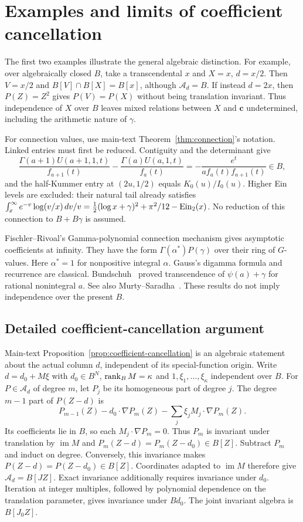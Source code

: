 \section{Examples and limits of coefficient cancellation}\label{sup:cancellation-remarks}
The first two examples illustrate the general algebraic distinction.
For example, over algebraically closed $B$, take a transcendental $x$
and $X=x$, $d=x/2$. Then $V=x/2$ and $B[V]\cap B[X]=B[x]$, although
$\mathcal A_d=B$. If instead $d=2x$, then $P(Z)=Z^2$ gives
$P(V)=P(X)$ without being translation invariant. Thus independence of
$X$ over $B$ leaves mixed relations between $X$ and $\mathbf c$ undetermined,
including the arithmetic nature of $\gamma$.

For connection values, use main-text Theorem~\ref{thm:connection}'s notation.
Linked entries must first be reduced. Contiguity and the determinant give
\[
 \frac{\Gamma(a+1)U(a+1,1,t)}{f_{a+1}(t)}
 -\frac{\Gamma(a)U(a,1,t)}{f_a(t)}
 =-\frac{e^t}{a f_a(t)f_{a+1}(t)}\in B,
\]
and the half-Kummer entry at $(2u,1/2)$ equals $K_0(u)/I_0(u)$.
Higher Ein levels are excluded: their natural tail already satisfies
$\int_x^\infty e^{-v}\log(v/x)\,dv/v
 =\tfrac12(\log x+\gamma)^2+\pi^2/12-\operatorname{Ein}_2(x)$.
No reduction of this connection to $B+B\gamma$ is assumed.

Fischler--Rivoal's Gamma-polynomial connection mechanism
\cite[Theorem~2(iii) and the subsequent discussion on p.~35]{FischlerRivoal2016}
gives asymptotic coefficients at infinity.
They have the form $\Gamma(\alpha^*)P(\gamma)$ over their ring of $G$-values.
Here $\alpha^*=1$ for nonpositive integral $\alpha$.
Gauss's digamma formula and recurrence are classical.
Bundschuh~\cite[Corollary~1]{Bundschuh1979} proved transcendence of
$\psi(a)+\gamma$ for rational nonintegral $a$. See also
Murty--Saradha~\cite[Theorems~1, 3--4]{MurtySaradha2007}.
These results do not imply independence over the present $B$.

\subsection*{Detailed coefficient-cancellation argument}
Main-text Proposition~\ref{prop:coefficient-cancellation} is an algebraic
statement about the actual column $d$, independent of its special-function
origin. Write $d=d_0+M\xi$ with $d_0\in B^N$, $\operatorname{rank}_B M=\kappa$
and $1,\xi_1,\ldots,\xi_\kappa$ independent over $B$.
For $P\in\mathcal A_d$ of degree $m$, let $P_j$ be its homogeneous part
of degree $j$. The degree $m-1$ part of $P(Z-d)$ is
\[
 P_{m-1}(Z)-d_0\cdot\nabla P_m(Z)
 -\sum_j\xi_jM_j\cdot\nabla P_m(Z).
\]
Its coefficients lie in $B$, so each $M_j\cdot\nabla P_m=0$.
Thus $P_m$ is invariant under translation by $\operatorname{im}M$ and
$P_m(Z-d)=P_m(Z-d_0)\in B[Z]$. Subtract $P_m$ and induct on degree.
Conversely, this invariance makes $P(Z-d)=P(Z-d_0)\in B[Z]$.
Coordinates adapted to $\operatorname{im}M$ therefore give
$\mathcal A_d=B[JZ]$. Exact invariance additionally requires invariance
under $d_0$. Iteration at integer multiples, followed by polynomial
dependence on the translation parameter, gives invariance under $Bd_0$.
The joint invariant algebra is $B[J_0Z]$.


